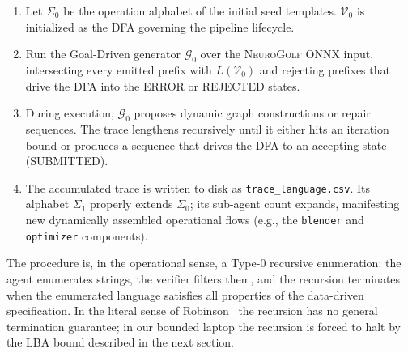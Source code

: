 \begin{enumerate}
\item Let $\Sigma_0$ be the operation alphabet of the initial
seed templates. $\mathcal{V}_0$ is initialized as the DFA governing
the pipeline lifecycle.
\item Run the Goal-Driven generator $\mathcal{G}_0$ over the
\textsc{NeuroGolf ONNX} input, intersecting every emitted
prefix with $L(\mathcal{V}_0)$ and rejecting prefixes that
drive the DFA into the \textsf{ERROR} or \textsf{REJECTED} states.
\item During execution, $\mathcal{G}_0$ proposes dynamic graph
constructions or repair sequences. The trace lengthens recursively
until it either hits an iteration bound or produces a sequence
that drives the DFA to an accepting state (\textsf{SUBMITTED}).
\item The accumulated trace is written to disk as
\texttt{trace\_language.csv}. Its alphabet $\Sigma_1$ properly
extends $\Sigma_0$; its sub-agent count expands, manifesting
new dynamically assembled operational flows (e.g., the
\texttt{blender} and \texttt{optimizer} components).
\end{enumerate}

The procedure is, in the operational sense, a Type-0 recursive
enumeration: the agent enumerates strings, the verifier filters
them, and the recursion terminates when the enumerated language
satisfies all properties of the data-driven specification.  In
the literal sense of
Robinson~\cite{robinson1949definability,davis1961decision} the
recursion has no general termination guarantee; in our bounded
laptop the recursion is forced to halt by the LBA bound described
in the next section.
